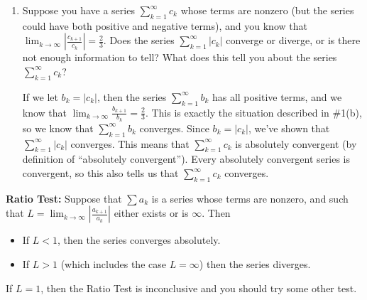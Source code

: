 \documentclass[main]{subfiles}
\begin{document}
\begin{enumerate}
\begin{enumerate}
    \item

    
    \begin{problem}[2in]
    Suppose you have a series $\displaystyle \sum_{k=1}^\infty c_k$
    whose terms are nonzero (but the series could have both positive and
    negative terms), and you know that $\displaystyle \lim_{k \to
    \infty} \left| \frac{c_{k+1}}{c_k} \right| = \frac{2}{3}$.  Does
    the series $\displaystyle \sum_{k=1}^\infty |c_k|$ converge or
    diverge, or is there not enough information to tell?  What does this
    tell you about the series $\displaystyle \sum_{k=1}^\infty c_k$?
    \end{problem}

    \begin{solution}
    If we let $b_k = |c_k|$, then the series $\displaystyle
    \sum_{k=1}^\infty b_k$ has all positive terms, and we know that
    $\displaystyle \lim_{k \to \infty} \frac{b_{k+1}}{b_k} =
    \frac{2}{3}$.  This is exactly the situation described in
    {{\#1}(b)}, so we know that $\displaystyle
    \sum_{k=1}^\infty b_k$ converges.  Since $b_k = |c_k|$, we've shown
    that $\displaystyle \sum_{k=1}^\infty |c_k|$ converges.  This means
    that $\displaystyle \sum_{k=1}^\infty c_k$ is absolutely convergent
    (by definition of ``absolutely convergent'').  Every absolutely
    convergent series is convergent, so this also tells us that
    $\displaystyle \sum_{k=1}^\infty c_k$ converges. 
    \end{solution}
    
  \end{enumerate}

  \pspace{\newpage}

\begin{problemonly}
\begin{framed}
\textbf{Ratio Test:}  Suppose that $\displaystyle \sum a_{k}$ is a series whose terms are
nonzero, and such that $\displaystyle L = \lim_{k \to \infty} \left| \frac{a_{k+1}}{a_{k}} \right|$
either exists or is $\infty$.  Then
\begin{itemize}
  \item If $L < 1$, then the series converges absolutely.
  \item If $L > 1$ (which includes the case $L = \infty$) then the series diverges.
\end{itemize}
If $L = 1$, then the Ratio Test is inconclusive and you should try some other test.
\end{framed}
\end{problemonly}




\end{enumerate}
\end{document}
